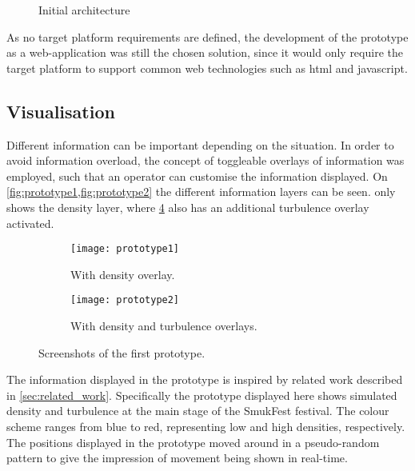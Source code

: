 \begin{figure}[htbp]
    \centering
    \caption{Initial architecture}
    \label{fig:init_architecture}
\end{figure}

As no target platform requirements are defined, the development of the prototype as a web-application was still the chosen solution, since it would only require the target platform to support common web technologies such as html and javascript.

\subsection{Visualisation}
Different information can be important depending on the situation. In order to avoid information overload, the concept of toggleable overlays of information was employed, such that an operator can customise the information displayed. On \cref{fig:prototype1,fig:prototype2} the different information layers can be seen.  only shows the density layer, where \cref{fig:prototype2} also has an additional turbulence overlay activated.

\begin{figure}[htbp]
\centering
\begin{subfigure}{.48\textwidth}
    \texttt{[image: prototype1]}
    \caption{With density overlay.}\label{fig:prototype1}
\end{subfigure}
\quad %
\begin{subfigure}{.48\textwidth}
    \texttt{[image: prototype2]}
    \caption{With density and turbulence overlays.}\label{fig:prototype2}
\end{subfigure}
\caption{Screenshots of the first prototype.}
\end{figure}

The information displayed in the prototype is inspired by related work described in \cref{sec:related_work}. Specifically the prototype displayed here shows simulated density and turbulence at the main stage of the SmukFest festival. The colour scheme ranges from blue to red, representing low and high densities, respectively. The positions displayed in the prototype moved around in a pseudo-random pattern to give the impression of movement being shown in real-time.